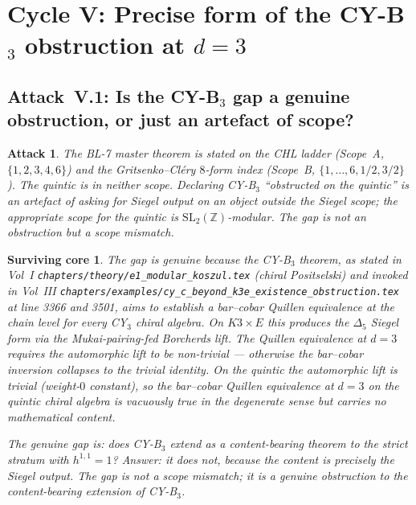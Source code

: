 \documentclass[11pt]{amsart}
\newtheorem{attack}[theorem]{Attack}
\newtheorem{surviving}[theorem]{Surviving core}
\providecommand{\Z}{\mathbb{Z}}
\providecommand{\SL}{\mathrm{SL}}
\begin{document}
\section{Cycle V: Precise form of the CY-B$_3$ obstruction at $d = 3$}
\label{sec:cycle-5-cy-b3-obstruction}

\subsection{Attack~V.1: Is the CY-B$_3$ gap a genuine obstruction,
or just an artefact of scope?}

\begin{attack}
\label{att:cy-b3-artefact}
The BL-7 master theorem is stated on the CHL ladder
(Scope~A, $\{1, 2, 3, 4, 6\}$) and the Gritsenko--Cl\'ery $8$-form
index (Scope~B, $\{1, \ldots, 6, 1/2, 3/2\}$). The quintic is in
neither scope. Declaring CY-B$_3$ ``obstructed on the quintic'' is
an artefact of asking for Siegel output on an object outside the
Siegel scope; the appropriate scope for the quintic is
$\SL_2(\Z)$-modular. The gap is not an obstruction but a scope
mismatch.
\end{attack}

\begin{surviving}
\label{surv:cy-b3-genuine-gap}
The gap \emph{is} genuine because the CY-B$_3$ theorem, as stated in
Vol~I \texttt{chapters/theory/e1\_modular\_koszul.tex} (chiral
Positselski) and invoked in Vol~III
\texttt{chapters/examples/cy\_c\_beyond\_k3e\_existence\_obstruction.tex}
at line 3366 and 3501, aims to establish a bar--cobar Quillen
equivalence at the chain level for every CY$_3$ chiral algebra. On
$K3 \times E$ this produces the $\Delta_5$ Siegel form via the
Mukai-pairing-fed Borcherds lift. The Quillen equivalence at $d = 3$
requires the automorphic lift to be non-trivial --- otherwise the
bar--cobar inversion collapses to the trivial identity.
On the quintic the automorphic lift is trivial (weight-$0$ constant),
so the bar--cobar Quillen equivalence at $d = 3$ on the quintic
chiral algebra is \emph{vacuously true} in the degenerate sense but
carries no mathematical content.

The genuine gap is: does CY-B$_3$ extend as a \emph{content-bearing}
theorem to the strict stratum with $h^{1,1} = 1$? Answer: it does
not, because the content is precisely the Siegel output. The gap is
not a scope mismatch; it is a genuine obstruction to the
content-bearing extension of CY-B$_3$.
\end{surviving}
\end{document}
